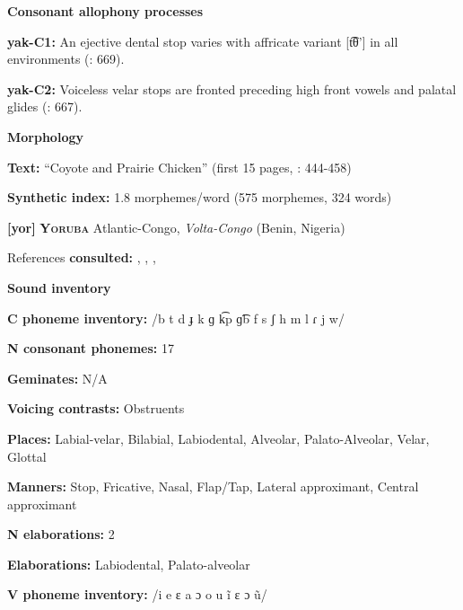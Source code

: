 \textbf{Consonant allophony processes}



\textbf{yak-C1:} An ejective dental stop varies with affricate variant [t͡θ’] in all environments (\citealt{RigsbyRude1996}: 669).



\textbf{yak-C2:} Voiceless velar stops are fronted preceding high front vowels and palatal glides (\citealt{RigsbyRude1996}: 667).



\textbf{Morphology}



\textbf{Text:} “Coyote and Prairie Chicken” (first 15 pages, \citealt{Jansen2010}: 444-458)



\textbf{Synthetic index:} 1.8 morphemes/word (575 morphemes, 324 words)



\textbf{[yor]}   \textbf{\textsc{Yoruba}}  Atlantic-Congo, \textit{Volta-Congo} (Benin, Nigeria)



References \textbf{consulted:} \citet{Bamgbose1966}, \citet{Rowlands1969}, \citet{Seidl2000}, \citet{Siertsema1959}



\textbf{Sound inventory}



\textbf{C phoneme inventory:} /b t d ɟ k ɡ k͡p ɡ͡b f s ʃ h m l ɾ j w/



\textbf{N consonant phonemes:} 17



\textbf{Geminates:} N/A



\textbf{Voicing contrasts:} Obstruents



\textbf{Places:} Labial-velar, Bilabial, Labiodental, Alveolar, Palato-Alveolar, Velar, Glottal



\textbf{Manners:} Stop, Fricative, Nasal, Flap/Tap, Lateral approximant, Central approximant



\textbf{N elaborations:} 2



\textbf{Elaborations:} Labiodental, Palato-alveolar



\textbf{V phoneme inventory:} /i e ɛ a ɔ o u ĩ ɛ ɔ ũ/



